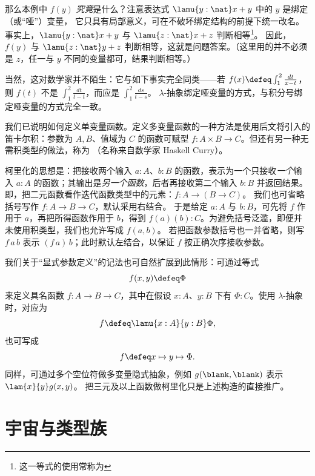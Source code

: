 那么本例中 $f(y)$ \emph{究竟}是什么？注意表达式 $\lamu{y:\nat} x + y$ 中的 $y$ 是绑定（或“哑”）变量，
%
%
%
%
它只具有局部意义，可在不破坏绑定结构的前提下统一改名。
事实上，$\lamu{y:\nat} x + y$ 与
$\lamu{z:\nat} x + z$ 判断相等\footnote{这一等式的使用常称为}。
因此，$f(y)$ 与 $\lamu{z:\nat} y + z$ 判断相等，这就是问题答案。（这里用的并不必须是 $z$，任一与 $y$ 不同的变量都可，结果判断相等。）

当然，这对数学家并不陌生：它与如下事实完全同类——若 $f(x) \defeq \int_1^2 \frac{dt}{x-t}$，则 $f(t)$ 不是 $\int_1^2 \frac{dt}{t-t}$，而应是 $\int_1^2 \frac{ds}{t-s}$。
$\lambda$-抽象绑定哑变量的方式，与积分号绑定哑变量的方式完全一致。

我们已说明如何定义单变量函数。定义多变量函数的一种方法是使用后文将引入的笛卡尔积：参数为 $A,B$、值域为 $C$ 的函数可赋型
$f : A \times B \to C$。但还有另一种无需积类型的做法，称为
%
%
（名称来自数学家 Haskell Curry）。
%

柯里化的思想是：把接收两个输入 $a:A$、$b:B$ 的函数，表示为一个只接收\emph{一个}输入 $a:A$ 的函数；其输出是\emph{另一个函数}，后者再接收第二个输入 $b:B$ 并返回结果。
即，把二元函数看作迭代函数类型中的元素：$f : A \to (B \to C)$。
我们也可省略括号写作 $f : A \to B \to C$，默认采用右结合。
于是给定 $a : A$ 与 $b : B$，可先将 $f$ 作用于 $a$，再把所得函数作用于 $b$，得到
$f(a)(b) : C$。为避免括号泛滥，即便并未使用积类型，我们也允许写成 $f(a,b)$。
若把函数参数括号也一并省略，则写 $f\,a\,b$ 表示 $(f\,a)\,b$；此时默认左结合，以保证 $f$ 按正确次序接收参数。

我们关于“显式参数定义”的记法也可自然扩展到此情形：可通过等式
\[ f(x,y) \defeq \Phi\]
来定义具名函数 $f : A \to B \to C$，其中在假设 $x:A$、$y:B$ 下有 $\Phi:C$。使用 $\lambda$-抽象时，对应为
\[ f \defeq \lamu{x:A}{y:B} \Phi, \]
也可写成
\[ f \defeq x \mapsto y \mapsto \Phi. \]
同样，可通过多个空位符做多变量隐式抽象，例如 $g(\blank,\blank)$ 表示 $\lam{x}{y} g(x,y)$。
把三元及以上函数做柯里化只是上述构造的直接推广。
 
%
%


\section{宇宙与类型族}
\label{sec:universes}

